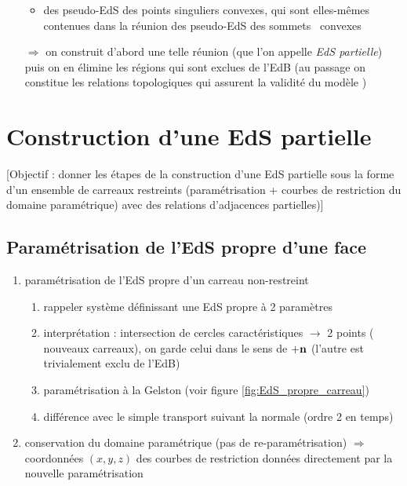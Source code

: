 \begin{enumerate}
\begin{itemize}
		\item des pseudo-EdS des points singuliers convexes, qui sont elles-mêmes contenues dans la réunion des pseudo-EdS des sommets \brep\ convexes
	\end{itemize}
	\item[$\Rightarrow$] on construit d'abord une telle réunion (que l'on appelle \textit{EdS partielle}) puis on en élimine les régions qui sont exclues de l'EdB (au passage on constitue les relations topologiques qui assurent la validité du modèle \brep)
\end{enumerate}












\section{Construction d'une EdS partielle}
\label{section:def_canal_surface}

[Objectif : donner les étapes de la construction d'une EdS partielle sous la forme d'un ensemble de carreaux restreints (paramétrisation + courbes de restriction du domaine paramétrique) avec des relations d'adjacences partielles)]




\subsection{Paramétrisation de l'EdS propre d'une face \brep}%
\label{section:parametrisation_eds_propre_face}
\begin{enumerate}
	\item paramétrisation de l'EdS propre d'un carreau non-restreint
	\begin{enumerate}
		\item rappeler système définissant une EdS propre à 2 paramètres
		
		\item interprétation : intersection de cercles caractéristiques $\to$ 2 points ( nouveaux carreaux), on garde celui dans le sens de $+\mathbf{n}$ (l'autre est trivialement exclu de l'EdB)
		\item paramétrisation à la Gelston \cite{gelston1995} (voir figure \autoref{fig:EdS_propre_carreau})
		
		\item différence avec le simple transport suivant la normale (ordre 2 en temps) \cite{jiao2001}
	\end{enumerate}
	\item conservation du domaine paramétrique (pas de re-paramétrisation) $\Rightarrow$ coordonnées $(x,y,z)$ des courbes de restriction données directement par la nouvelle paramétrisation
\end{enumerate}



